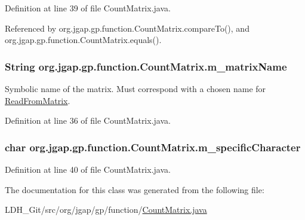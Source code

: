 Definition at line 39 of file Count\-Matrix.\-java.



Referenced by org.\-jgap.\-gp.\-function.\-Count\-Matrix.\-compare\-To(), and org.\-jgap.\-gp.\-function.\-Count\-Matrix.\-equals().

\hypertarget{classorg_1_1jgap_1_1gp_1_1function_1_1_count_matrix_a8a4aaa596857d2e87306129251a9ff83}{
\subsubsection[{m\-\_\-matrix\-Name}]{\setlength{\rightskip}{0pt plus 5cm}String org.\-jgap.\-gp.\-function.\-Count\-Matrix.\-m\-\_\-matrix\-Name\hspace{0.3cm}{\ttfamily [private]}}}\label{classorg_1_1jgap_1_1gp_1_1function_1_1_count_matrix_a8a4aaa596857d2e87306129251a9ff83}
Symbolic name of the matrix. Must correspond with a chosen name for \hyperlink{classorg_1_1jgap_1_1gp_1_1function_1_1_read_from_matrix}{Read\-From\-Matrix}. 

Definition at line 36 of file Count\-Matrix.\-java.

\hypertarget{classorg_1_1jgap_1_1gp_1_1function_1_1_count_matrix_a2c021d2b7127e90eb2a091f3082915b8}{
\subsubsection[{m\-\_\-specific\-Character}]{\setlength{\rightskip}{0pt plus 5cm}char org.\-jgap.\-gp.\-function.\-Count\-Matrix.\-m\-\_\-specific\-Character\hspace{0.3cm}{\ttfamily [private]}}}\label{classorg_1_1jgap_1_1gp_1_1function_1_1_count_matrix_a2c021d2b7127e90eb2a091f3082915b8}


Definition at line 40 of file Count\-Matrix.\-java.



The documentation for this class was generated from the following file\-:\begin{DoxyCompactItemize}
\item 
L\-D\-H\-\_\-\-Git/src/org/jgap/gp/function/\hyperlink{_count_matrix_8java}{Count\-Matrix.\-java}\end{DoxyCompactItemize}
